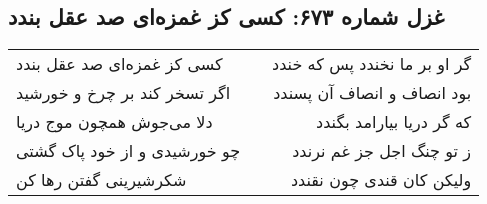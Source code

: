 \begin{center}
\section*{غزل شماره ۶۷۳: کسی کز غمزه‌ای صد عقل بندد}
\label{sec:0673}
\begin{longtable}{l p{0.5cm} r}
کسی کز غمزه‌ای صد عقل بندد
&&
گر او بر ما نخندد پس که خندد
\\
اگر تسخر کند بر چرخ و خورشید
&&
بود انصاف و انصاف آن پسندد
\\
دلا می‌جوش همچون موج دریا
&&
که گر دریا بیارامد بگندد
\\
چو خورشیدی و از خود پاک گشتی
&&
ز تو چنگ اجل جز غم نرندد
\\
شکرشیرینی گفتن رها کن
&&
ولیکن کان قندی چون نقندد
\\
\end{longtable}
\end{center}
